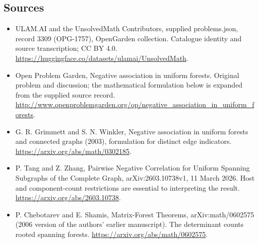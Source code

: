 \documentclass[11pt,a4paper]{article}
\begin{document}
\subsection{Sources}
\begin{itemize}
\item[S1] ULAM.AI and the UnsolvedMath Contributors, supplied problems.json, record 3309 (OPG-1757), OpenGarden collection. Catalogue identity and source transcription; CC BY 4.0.
\url{https://huggingface.co/datasets/ulamai/UnsolvedMath}.
\item[S2] Open Problem Garden, Negative association in uniform forests. Original problem and discussion; the mathematical formulation below is expanded from the supplied source record.
\url{http://www.openproblemgarden.org/op/negative_association_in_uniform_forests}.
\item[S3] G. R. Grimmett and S. N. Winkler, Negative association in uniform forests and connected graphs (2003), formulation for distinct edge indicators.
\url{https://arxiv.org/abs/math/0302185}.
\item[S4] P. Tang and Z. Zhang, Pairwise Negative Correlation for Uniform Spanning Subgraphs of the Complete Graph, arXiv:2603.10738v1, 11 March 2026. Host and component-count restrictions are essential to interpreting the result.
\url{https://arxiv.org/abs/2603.10738}.
\item[S5] P. Chebotarev and E. Shamis, Matrix-Forest Theorems, arXiv:math/0602575 (2006 version of the authors' earlier manuscript). The determinant counts rooted spanning forests.
\url{https://arxiv.org/abs/math/0602575}.
\end{itemize}
\end{document}
